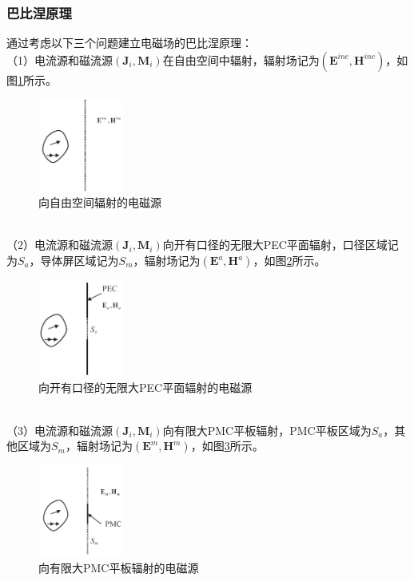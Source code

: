 \documentclass{article}
\numberwithin{equation}{section}
\begin{document}
\subsubsection{巴比涅原理}
通过考虑以下三个问题建立电磁场的巴比涅原理：\\
（1）电流源和磁流源$(\mathbf{J}_i,\mathbf{M}_i)$在自由空间中辐射，辐射场记为$(\mathbf{E}^{inc},\mathbf{H}^{inc})$，如图\ref{fig:fig32}所示。
\begin{figure}[ht]
    \centering
    \includegraphics[width=0.25\textwidth]{向自由空间辐射的电磁源.PNG}
    \caption{向自由空间辐射的电磁源}
    \label{fig:fig32}
\end{figure}
\\
（2）电流源和磁流源$(\mathbf{J}_i,\mathbf{M}_i)$向开有口径的无限大PEC平面辐射，口径区域记为$S_a$，导体屏区域记为$S_m$，辐射场记为$(\mathbf{E}^{a},\mathbf{H}^{a})$，如图\ref{fig:fig33}所示。
\begin{figure}[ht]
    \centering
    \includegraphics[width=0.25\textwidth]{向开有口径的无限大PEC平面辐射的电磁源.PNG}
    \caption{向开有口径的无限大PEC平面辐射的电磁源}
    \label{fig:fig33}
\end{figure}
\\
（3）电流源和磁流源$(\mathbf{J}_i,\mathbf{M}_i)$向有限大PMC平板辐射，PMC平板区域为$S_a$，其他区域为$S_m$，辐射场记为$(\mathbf{E}^{m},\mathbf{H}^{m})$，如图\ref{fig:fig34}所示。
\begin{figure}[ht]
    \centering
    \includegraphics[width=0.25\textwidth]{向有限大PMC平板辐射的电磁源.PNG}
    \caption{向有限大PMC平板辐射的电磁源}
    \label{fig:fig34}
\end{figure}
\end{document}
